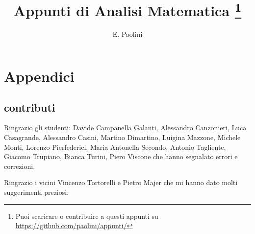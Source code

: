 \documentclass[italian,a4paper,oneside,headinclude]{scrbook}
\title{Appunti di Analisi Matematica%
\thanks{%
Puoi scaricare o contribuire a questi appunti su
\url{https://github.com/paolini/appunti/}}}
\author{E. Paolini}
\begin{document}
\maketitle

\tableofcontents















%



\backmatter
\chapter{Appendici}

\section{contributi}

Ringrazio gli studenti:
%
Davide Campanella Galanti,
Alessandro Canzonieri,
Luca Casagrande,
Alessandro Casini,
Martino Dimartino,
Luigina Mazzone,
Michele Monti,
Lorenzo Pierfederici,
Maria Antonella Secondo,
Antonio Tagliente,
Giacomo Trupiano,
Bianca Turini,
Piero Viscone
%
che hanno segnalato errori e correzioni.

Ringrazio i vicini Vincenzo Tortorelli e Pietro Majer
che mi hanno dato molti suggerimenti preziosi.

\nocite{Giusti}
\nocite{Courant}
\nocite{Marcellini}




\printindex
\end{document}
